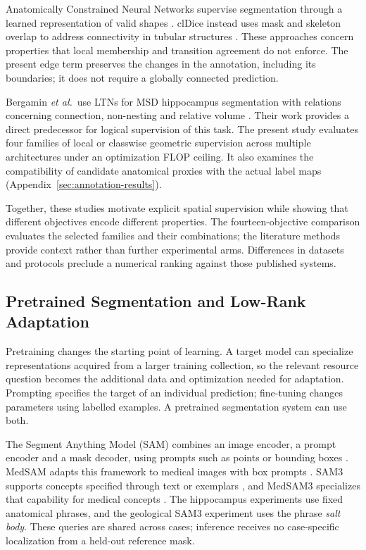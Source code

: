 \documentclass[12pt,a4paper]{article}
\begin{document}
Anatomically Constrained Neural Networks supervise segmentation through
a learned representation of valid shapes \cite{oktay2017anatomically}.
clDice instead uses mask and skeleton overlap to address connectivity
in tubular structures \cite{shit2021cldice}. These approaches concern
properties that local membership and transition agreement do not enforce.
The present edge term preserves the changes in the annotation, including
its boundaries; it does not require a globally connected prediction.

Bergamin \emph{et al.}\ use LTNs for MSD hippocampus segmentation with relations
concerning connection, non-nesting and relative volume
\cite{bergamin2025integrating}. Their work provides a direct predecessor
for logical supervision of this task. The present study evaluates four
families of local or classwise geometric supervision across multiple
architectures under an optimization FLOP ceiling. It also examines the
compatibility of candidate anatomical proxies with the actual label maps
(Appendix~\ref{sec:annotation-results}).

Together, these studies motivate explicit spatial supervision while
showing that different objectives encode different properties. The
fourteen-objective comparison evaluates the selected families and their
combinations; the literature methods provide context rather than further
experimental arms. Differences in datasets and protocols preclude a
numerical ranking against those published systems.

\subsection{Pretrained Segmentation and Low-Rank Adaptation}
\label{sec:pretrained-adaptation}

Pretraining changes the starting point of learning. A target model can
specialize representations acquired from a larger training collection,
so the relevant resource question becomes the additional data and
optimization needed for adaptation. Prompting specifies the target of
an individual prediction; fine-tuning changes parameters using labelled
examples. A pretrained segmentation system can use both.

The Segment Anything Model (SAM) combines an image encoder, a prompt encoder and a mask decoder,
using prompts such as points or bounding boxes
\cite{kirillov2023segment}. MedSAM adapts this framework to medical
images with box prompts \cite{ma2024medsam}. SAM3 supports concepts
specified through text or exemplars \cite{carion2025sam3}, and MedSAM3
specializes that capability for medical concepts \cite{liu2025medsam3}.
The hippocampus experiments use fixed anatomical phrases, and the
geological SAM3 experiment uses the phrase \emph{salt body}. These queries
are shared across cases; inference receives no case-specific localization
from a held-out reference mask.
\end{document}
